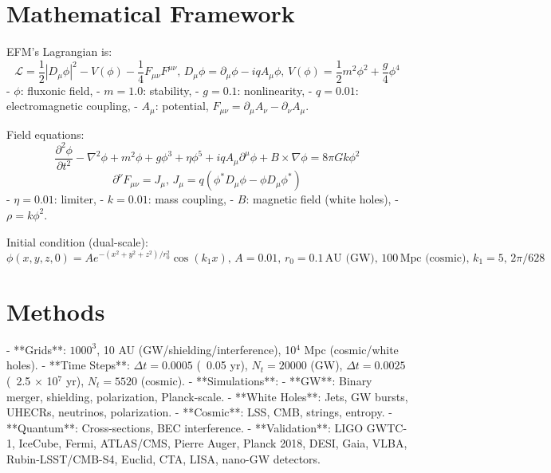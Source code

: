 \documentclass[11pt]{article}
\begin{document}
\section{Mathematical Framework}
EFM’s Lagrangian is:
\begin{equation}
\mathcal{L} = \frac{1}{2} |D_\mu \phi|^2 - V(\phi) - \frac{1}{4} F_{\mu \nu} F^{\mu \nu}, \, D_\mu \phi = \partial_\mu \phi - i q A_\mu \phi, \, V(\phi) = \frac{1}{2} m^2 \phi^2 + \frac{g}{4} \phi^4
\end{equation}
- \(\phi\): fluxonic field,
- \(m = 1.0\): stability,
- \(g = 0.1\): nonlinearity,
- \(q = 0.01\): electromagnetic coupling,
- \(A_\mu\): potential, \(F_{\mu \nu} = \partial_\mu A_\nu - \partial_\nu A_\mu\).

Field equations:
\begin{equation}
\frac{\partial^2 \phi}{\partial t^2} - \nabla^2 \phi + m^2 \phi + g \phi^3 + \eta \phi^5 + i q A_\mu \partial^\mu \phi + B \times \nabla \phi = 8\pi G k \phi^2
\end{equation}
\begin{equation}
\partial^\nu F_{\mu \nu} = J_\mu, \, J_\mu = q (\phi^* D_\mu \phi - \phi D_\mu \phi^*)
\end{equation}
- \(\eta = 0.01\): limiter,
- \(k = 0.01\): mass coupling,
- \(B\): magnetic field (white holes),
- \(\rho = k \phi^2\).

Initial condition (dual-scale):
\begin{equation}
\phi(x, y, z, 0) = A e^{-(x^2 + y^2 + z^2) / r_0^2} \cos(k_1 x), \, A = 0.01, \, r_0 = 0.1 \, \text{AU (GW)}, \, 100 \, \text{Mpc (cosmic)}, \, k_1 = 5, \, 2\pi / 628
\end{equation}

\section{Methods}
- **Grids**: \(1000^3\), 10 AU (GW/shielding/interference), 10$^4$ Mpc (cosmic/white holes).
- **Time Steps**: \(\Delta t = 0.0005\) (~0.05 yr), \(N_t = 20000\) (GW), \(\Delta t = 0.0025\) (~2.5 × 10$^7$ yr), \(N_t = 5520\) (cosmic).
- **Simulations**:
  - **GW**: Binary merger, shielding, polarization, Planck-scale.
  - **White Holes**: Jets, GW bursts, UHECRs, neutrinos, polarization.
  - **Cosmic**: LSS, CMB, strings, entropy.
  - **Quantum**: Cross-sections, BEC interference.
- **Validation**: LIGO GWTC-1, IceCube, Fermi, ATLAS/CMS, Pierre Auger, Planck 2018, DESI, Gaia, VLBA, Rubin-LSST/CMB-S4, Euclid, CTA, LISA, nano-GW detectors.
\end{document}
